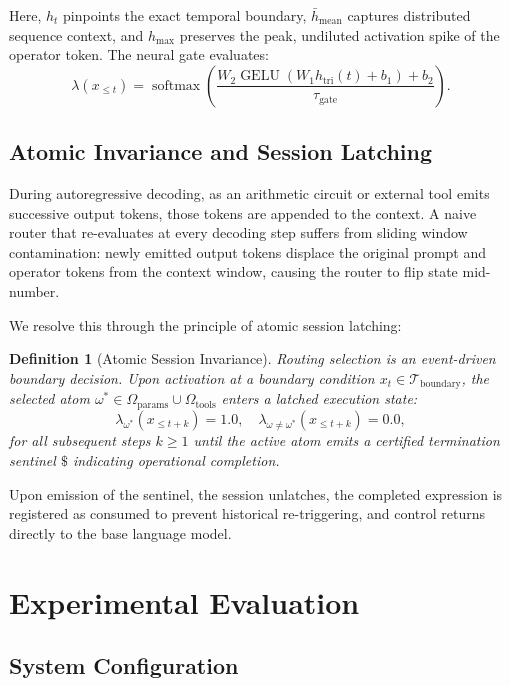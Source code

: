 \documentclass[preprint,12pt]{elsarticle}
\newtheorem{definition}{Definition}
\begin{document}
Here, $h_t$ pinpoints the exact temporal boundary, $\bar{h}_{\mathrm{mean}}$ captures distributed sequence context, and $h_{\mathrm{max}}$ preserves the peak, undiluted activation spike of the operator token. The neural gate evaluates:
\begin{equation}
\lambda(x_{\le t}) = \operatorname{softmax}\left( \frac{W_2 \operatorname{GELU}(W_1 h_{\mathrm{tri}}(t) + b_1) + b_2}{\tau_{\mathrm{gate}}} \right).
\end{equation}

\subsection{Atomic Invariance and Session Latching}

During autoregressive decoding, as an arithmetic circuit or external tool emits successive output tokens, those tokens are appended to the context. A naive router that re-evaluates at every decoding step suffers from sliding window contamination: newly emitted output tokens displace the original prompt and operator tokens from the context window, causing the router to flip state mid-number.

We resolve this through the principle of atomic session latching:
\begin{definition}[Atomic Session Invariance]
Routing selection is an event-driven boundary decision. Upon activation at a boundary condition $x_t \in \mathcal{T}_{\mathrm{boundary}}$, the selected atom $\omega^* \in \Omega_{\mathrm{params}} \cup \Omega_{\mathrm{tools}}$ enters a latched execution state:
\begin{equation}
\lambda_{\omega^*}(x_{\le t+k}) = 1.0, \quad \lambda_{\omega \neq \omega^*}(x_{\le t+k}) = 0.0,
\end{equation}
for all subsequent steps $k \ge 1$ until the active atom emits a certified termination sentinel $\$$ indicating operational completion.
\end{definition}

Upon emission of the sentinel, the session unlatches, the completed expression is registered as consumed to prevent historical re-triggering, and control returns directly to the base language model.

\section{Experimental Evaluation}

\subsection{System Configuration}
\end{document}
